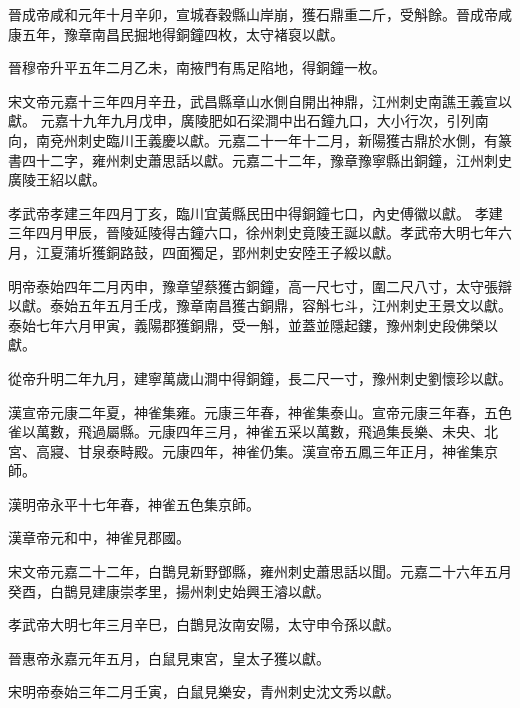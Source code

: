 \begin{pinyinscope}
 晉成帝咸和元年十月辛卯，宣城舂穀縣山岸崩，獲石鼎重二斤，受斛餘。晉成帝咸康五年，豫章南昌民掘地得銅鐘四枚，太守褚裒以獻。



 晉穆帝升平五年二月乙未，南掖門有馬足陷地，得銅鐘一枚。



 宋文帝元嘉十三年四月辛丑，武昌縣章山水側自開出神鼎，江州刺史南譙王義宣以獻。
 元嘉十九年九月戊申，廣陵肥如石梁澗中出石鐘九口，大小行次，引列南向，南兗州刺史臨川王義慶以獻。元嘉二十一年十二月，新陽獲古鼎於水側，有篆書四十二字，雍州刺史蕭思話以獻。元嘉二十二年，豫章豫寧縣出銅鐘，江州刺史廣陵王紹以獻。



 孝武帝孝建三年四月丁亥，臨川宜黃縣民田中得銅鐘七口，內史傅徽以獻。
 孝建三年四月甲辰，晉陵延陵得古鐘六口，徐州刺史竟陵王誕以獻。孝武帝大明七年六月，江夏蒲圻獲銅路鼓，四面獨足，郢州刺史安陸王子綏以獻。



 明帝泰始四年二月丙申，豫章望蔡獲古銅鐘，高一尺七寸，圍二尺八寸，太守張辯以獻。泰始五年五月壬戌，豫章南昌獲古銅鼎，容斛七斗，江州刺史王景文以獻。
 泰始七年六月甲寅，義陽郡獲銅鼎，受一斛，並蓋並隱起鏤，豫州刺史段佛榮以獻。



 從帝升明二年九月，建寧萬歲山澗中得銅鐘，長二尺一寸，豫州刺史劉懷珍以獻。



 漢宣帝元康二年夏，神雀集雍。元康三年春，神雀集泰山。宣帝元康三年春，五色雀以萬數，飛過屬縣。元康四年三月，神雀五采以萬數，飛過集長樂、未央、北
 宮、高寢、甘泉泰畤殿。元康四年，神雀仍集。漢宣帝五鳳三年正月，神雀集京師。



 漢明帝永平十七年春，神雀五色集京師。



 漢章帝元和中，神雀見郡國。



 宋文帝元嘉二十二年，白鵲見新野鄧縣，雍州刺史蕭思話以聞。元嘉二十六年五月癸酉，白鵲見建康崇孝里，揚州刺史始興王濬以獻。



 孝武帝大明七年三月辛巳，白鵲見汝南安陽，太守申令孫以獻。



 晉惠帝永嘉元年五月，白鼠見東宮，皇太子獲以獻。



 宋明帝泰始三年二月壬寅，白鼠見樂安，青州刺史沈文秀以獻。




\end{pinyinscope}
